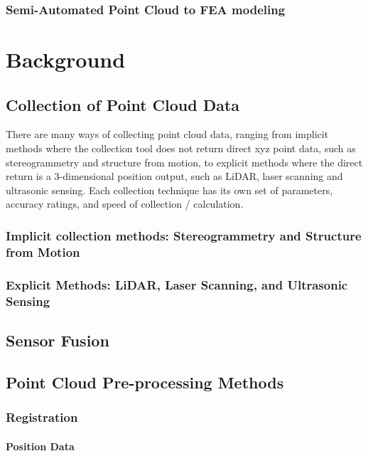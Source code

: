 \documentclass[12pt]{drexelthesis}
\let\Oldsection\section
\renewcommand{\section}{\FloatBarrier\Oldsection}
\let\Oldsubsection\subsection
\renewcommand{\subsection}{\FloatBarrier\Oldsubsection}
\let\Oldsubsubsection\subsubsection
\renewcommand{\subsubsection}{\FloatBarrier\Oldsubsubsection}
\begin{document}
\subsection{Semi-Automated Point Cloud to FEA modeling}
\label{subsec:SemiFEA}
\cite{RN29} \cite{RN31} \cite{RN38} \cite{RN54}
%
%
\chapter{Background}
\label{chap:background}
\section{Collection of Point Cloud Data}
\label{sec:PCcollection}
There are many ways of collecting point cloud data, ranging from implicit methods where the collection tool does not return direct xyz point data, such as stereogrammetry and structure from motion, to explicit methods where the direct return is a 3-dimensional position output, such as LiDAR, laser scanning and ultrasonic sensing. Each collection technique has its own set of parameters, accuracy ratings, and speed of collection / calculation.
\subsection{Implicit collection methods: Stereogrammetry and Structure from Motion}
\label{subsec:implicit}
\cite{RN20}
\subsection{Explicit Methods: LiDAR, Laser Scanning, and Ultrasonic Sensing}
\label{subsec:explicit}
\section{Sensor Fusion}
\label{sec:fusion}
\section{Point Cloud Pre-processing Methods}
\label{sec:preprocessing}
\subsection{Registration}
\subsubsection{Position Data}
\end{document}
